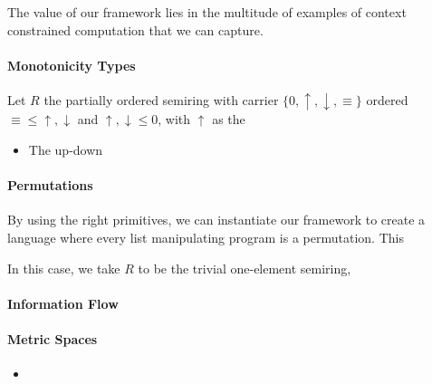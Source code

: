 The value of our framework lies in the multitude of examples of
context constrained computation that we can capture.

\paragraph{Monotonicity Types} Let $R$ the partially ordered semiring
with carrier $\{0,\uparrow,\downarrow,\equiv\}$ ordered
$\equiv \leq \uparrow,\downarrow$ and $\uparrow, \downarrow \leq 0$, with $\uparrow$ as the 
\begin{itemize}
\item The up-down 
\end{itemize}

\paragraph{Permutations} By using the right primitives, we can
instantiate our framework to create a language where every list manipulating program is a permutation. This 

In this case, we take $R$ to be the trivial
one-element semiring, 

\paragraph{Information Flow}

\paragraph{Metric Spaces}
\begin{itemize}
\item 
\end{itemize}


